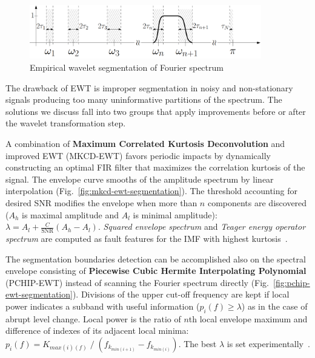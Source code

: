 \begin{figure}[ht]
    \centering
    \includegraphics[width=0.9\textwidth]{assets/EWT.png}
    \caption{Empirical wavelet segmentation of Fourier spectrum~\cite{gilles_empirical_2013}}
    \label{fig:ewt-spectrum-segmentation}
\end{figure}

The drawback of EWT is improper segmentation in noisy and non-stationary signals producing too many uninformative partitions of the spectrum. The solutions we discuss fall into two groups that apply improvements before or after the wavelet transformation step. 

A combination of \textbf{Maximum Correlated Kurtosis Deconvolution} and improved EWT (MKCD-EWT) favors periodic impacts by dynamically constructing an optimal FIR filter that maximizes the correlation kurtosis of the signal. The envelope curve smooths of the amplitude spectrum by linear interpolation (Fig.~\ref{fig:mkcd-ewt-segmentation}). The threshold accounting for desired SNR modifies the envelope when more than $n$ components are discovered ($A_h$ is maximal amplitude and $A_l$ is minimal amplitude): $\lambda = A_l + \frac{C}{\mathrm{SNR}}(A_h - A_l)$. \emph{Squared envelope spectrum} and \emph{Teager energy operator spectrum} are computed as fault features for the IMF with highest kurtosis~\cite{li_fault_2019}. 

The segmentation boundaries detection can be accomplished also on the spectral envelope consisting of \textbf{Piecewise Cubic Hermite Interpolating Polynomial} (PCHIP-EWT) instead of scanning the Fourier spectrum directly (Fig.~\ref{fig:pchip-ewt-segmentation}). Divisions of the upper cut-off frequency are kept if local power indicates a subband with useful information ($p_i(f) \geq \lambda$)  as in the case of abrupt level change. Local power is the ratio of $n$th local envelope maximum and difference of indexes of its adjacent local minima:  $p_i(f) = K_{max(i)(f)} \;/\;\left(f_{k_{min(i+1)}} - f_{k_{min(i)}}\right)$. The best $\lambda$ is set experimentally~\cite{zhuang_improved_2020}.

